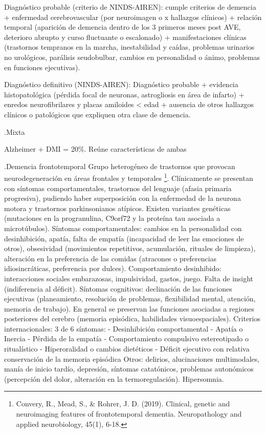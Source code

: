 Diagnóstico probable (criterio de NINDS-AIREN): cumple criterios de demencia + enfermedad cerebrovascular (por neuroimagen o x hallazgos clínicos) + relación temporal (aparición de demencia dentro de los 3 primeros meses post AVE, deterioro abrupto y curso fluctuante o escalonado) + manifestaciones clínicas (trastornos tempranos en la marcha, inestabilidad y caídas, problemas urinarios no urológicos, parálisis seudobulbar, cambios en personalidad o ánimo, problemas en funciones ejecutivas).

Diagnóstico definitivo (NINDS-AIREN): Diagnóstico probable + evidencia histopatológica (pérdida focal de neuronas, astrogliosis en área de infarto) + enredos neurofibrilares y placas amiloides < edad + ausencia de otros hallazgos clínicos o patológicos que expliquen otra clase de demencia.

.Mixta

Alzheimer + DMI = 20\%. Reúne características de ambas

.Demencia frontotemporal
Grupo heterogéneo de trastornos que provocan neurodegeneración en áreas frontales y temporales \footnote{Convery, R., Mead, S., \& Rohrer, J. D. (2019). Clinical, genetic and neuroimaging features of frontotemporal dementia. Neuropathology and applied neurobiology, 45(1), 6-18.}. Clínicamente se presentan con síntomas comportamentales, trastornos del lenguaje (afasia primaria progresiva), pudiendo haber superposición con la enfermedad de la neurona motora y trastornos parkinsonianos atípicos. Existen variantes genéticas (mutaciones en la progranulina, C9orf72 y la proteína tau asociada a microtúbulos).
Síntomas comportamentales: cambios en la personalidad con desinhibición, apatía, falta de empatía (incapacidad de leer las emociones de otros), obsesividad (movimientos repetitivos, acumulación, rituales de limpieza), alteración en la preferencia de las comidas (atracones o preferencias idiosincráticas, preferencia por dulces). Comportamiento desinhibido: interacciones sociales embarazosas, impulsividad, gastos, juego. Falta de insight (indiferencia al déficit).
Síntomas cognitivos: declinación de las funciones ejecutivas (planeamiento, resolución de problemas, flexibilidad mental, atención, memoria de trabajo). En general se preservan las funciones asociadas a regiones posteriores del cerebro (memoria episódica, habilidades visuoespaciales).
Criterios internacionales: 3 de 6 síntomas:
- Desinhibición comportamental
- Apatía o Inercia
- Pérdida de la empatía
- Comportamiento compulsivo estereotipado o ritualístico
- Hiperoralidad o cambios dietéticos
- Déficit ejecutivo con relativa conservación de la memoria episódica
Otros: delirios, alucinaciones multimodales, manía de inicio tardío, depresión, síntomas catatónicos, problemas autonómicos (percepción del dolor, alteración en la termoregulación). Hipersomnia.

